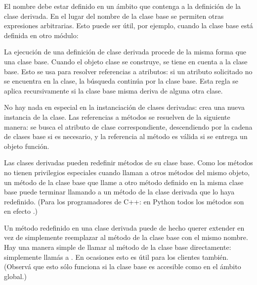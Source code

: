 \documentclass[a4,10pt,spanish]{sphinxmanual}
\begin{document}
\sphinxAtStartPar
El nombre  debe estar definido en un ámbito que contenga a la definición de la clase derivada.  En el lugar del nombre de la clase base se permiten otras expresiones arbitrarias.  Esto puede ser útil, por ejemplo, cuando la clase base está definida en otro módulo:

\begin{sphinxVerbatim}[commandchars=\\\{\}]
 
\end{sphinxVerbatim}

\sphinxAtStartPar
La ejecución de una definición de clase derivada procede de la misma forma que una clase base.  Cuando el objeto clase se construye, se tiene en cuenta a la clase base.  Esto se usa para resolver referencias a atributos: si un atributo solicitado no se encuentra en la clase, la búsqueda continúa por la clase base. Esta regla se aplica recursivamente si la clase base misma deriva de alguna otra clase.

\sphinxAtStartPar
No hay nada en especial en la instanciación de clases derivadas:  crea una nueva instancia de la clase.  Las referencias a métodos se resuelven de la siguiente manera: se busca el atributo de clase correspondiente, descendiendo por la cadena de clases base si es necesario, y la referencia al método es válida si se entrega un objeto función.

\sphinxAtStartPar
Las clases derivadas pueden redefinir métodos de su clase base.  Como los métodos no tienen privilegios especiales cuando llaman a otros métodos del mismo objeto, un método de la clase base que llame a otro método definido en la misma clase base puede terminar llamando a un método de la clase derivada que lo haya redefinido.  (Para los programadores de C++: en Python todos los métodos son en efecto .)

\sphinxAtStartPar
Un método redefinido en una clase derivada puede de hecho querer extender en vez de simplemente reemplazar al método de la clase base con el mismo nombre. Hay una manera simple de llamar al método de la clase base directamente: simplemente llamás a .  En ocasiones esto es útil para los clientes también.  (Observá que esto sólo funciona si la clase base es accesible como  en el ámbito global.)
\end{document}
